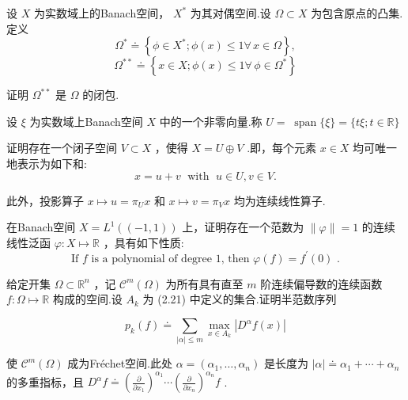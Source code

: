 \begin{rbhw}
设 $X$ 为实数域上的Banach空间， ${X}^{ * }$ 为其对偶空间.设 $\Omega  \subset  X$ 为包含原点的凸集.定义
\[
{\Omega }^{ * } \doteq  \left\{  {\phi  \in  {X}^{ * };\phi \left( x\right)  \leq  1\forall\,x \in  \Omega }\right\}  ,
\]
\[
{\Omega }^{* * } \doteq  \left\{  {x \in  X;\phi \left( x\right)  \leq  1\forall\,\phi  \in  {\Omega }^{ * }}\right\}
\]

证明 ${\Omega }^{* * }$ 是 $\Omega$ 的闭包.
\end{rbhw}

\begin{rbhw}
设 $\xi$ 为实数域上Banach空间 $X$ 中的一个非零向量.称 $U = \; \operatorname{span}\{ \xi \}  = \{ {t\xi };t \in  \mathbb{R}\}$

证明存在一个闭子空间 $V \subset  X$ ，使得 $X = U \oplus  V$ .即，每个元素 $x \in  X$ 均可唯一地表示为如下和:
\[
x = u + v\;\text{ with }\;u \in  U,v \in  V.
\]

此外，投影算子 $x \mapsto  u = {\pi }_{U}x$ 和 $x \mapsto  v = {\pi }_{V}x$ 均为连续线性算子.
\end{rbhw}

\begin{rbhw}
在Banach空间 $X = {L}^{1}\left( \left(  {-1,1}\right)  \right)$ 上，证明存在一个范数为 $\| \varphi \|  = 1$ 的连续线性泛函 $\varphi  : X \mapsto  \mathbb{R}$ ，具有如下性质:
\[
\text{ If }f\text{ is a polynomial of degree 1, then }\varphi \left( f\right)  = {f}^{\prime }\left( 0\right) \text{ . }
\]
\end{rbhw}

\begin{rbhw}
给定开集 $\Omega  \subset  {\mathbb{R}}^{n}$ ，记 ${\mathcal{C}}^{m}\left( \Omega \right)$ 为所有具有直至 $m$ 阶连续偏导数的连续函数 $f : \Omega  \mapsto  \mathbb{R}$ 构成的空间.设 ${A}_{k}$ 为 (2.21) 中定义的集合.证明半范数序列

\begin{equation}\tag{2.46}
{p}_{k}\left( f\right)  \doteq  \mathop{\sum }\limits_{{\left| \alpha \right|  \leq  m}}\mathop{\max }\limits_{{x \in  {A}_{k}}}\left| {{D}^{\alpha }f\left( x\right) }\right|
\end{equation}

使 ${\mathcal{C}}^{m}\left( \Omega \right)$ 成为Fréchet空间.此处 $\alpha  = \left( {{\alpha }_{1},\ldots ,{\alpha }_{n}}\right)$ 是长度为 $\left| \alpha \right|  \doteq  {\alpha }_{1} + \cdots  + {\alpha }_{n}$ 的多重指标，且 ${D}^{\alpha }f \doteq  {\left( \frac{\partial }{\partial {x}_{1}}\right) }^{{\alpha }_{1}}\cdots {\left( \frac{\partial }{\partial {x}_{n}}\right) }^{{\alpha }_{n}}f$ .
\end{rbhw}

